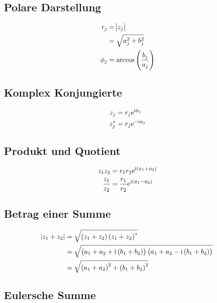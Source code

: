 \subsection{Polare Darstellung}

\begin{align*}
    r_j &= \abs{z_j} \\
        &= \sqrt{a_j^2 + b_j^2} \\
    \phi_j &= \darccos{\frac{b_j}{a_j}}
\end{align*}

\subsection{Komplex Konjungierte}

\begin{align*}
    z_j &= r_j\mathrm{e}^{\mathrm i\phi_j} \\
    z_j^* &= r_j\mathrm{e}^{-\mathrm i\phi_j}
\end{align*}

\subsection{Produkt und Quotient}

\begin{align*}
    z_1z_2 &= r_1r_2\eexp{\ii\del{\phi_1+\phi_2}} \\
    \frac{z_1}{z_2} &= \frac{r_1}{r_2} \eexp{\ii\del{\phi_1-\phi_2}}
\end{align*}

\subsection{Betrag einer Summe}

\begin{align*}
    \abs{z_1+z_2} &= \sqrt{\del{z_1+z_2}\del{z_1+z_2}^*} \\
                  &= \sqrt{ \del{a_1+a_2 + \ii\del{b_1+b_2}}\del{a_1+a_2 - \ii\del{b_1+b_2}}} \\
                  &= \sqrt{\del{a_1+a_2}^2 + \del{b_1+b_2}^2}
\end{align*}

\subsection{Eulersche Summe}


